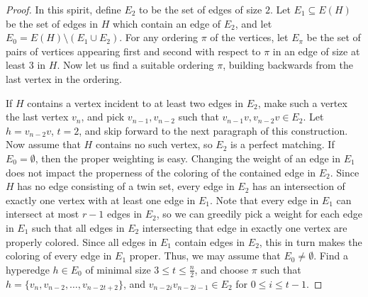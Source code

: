 \documentclass[reqno,12pt,epsf]{amsart}
\begin{document}
\begin{proof}
In this spirit, define $E_2$ to be the set of edges of size $2$.
Let $E_1\subseteq E(H)$ be the set of edges in $H$ which contain an edge of $E_2$, and let $E_0=E(H)\setminus (E_1\cup E_2)$. %
For any ordering $\pi$ of the vertices, let $E_\pi$ be the set of pairs of vertices appearing first and second with respect to $\pi$ in an edge of size at least $3$ in $H$. Now let us find a suitable ordering $\pi$, building backwards from the last vertex in the ordering.

If $H$ contains a vertex incident to at least two edges in $E_2$, make such a vertex the last vertex $v_n$, 
and pick $v_{n-1},v_{n-2}$ such that $v_{n-1}v,v_{n-2}v\in E_2$. Let $h=v_{n-2}v$, $t=2$,
and skip forward to the next paragraph of this construction. 
Now assume that $H$ contains no such vertex, so $E_2$ is a perfect matching. 
If $E_0=\emptyset$, then the proper weighting is easy. Changing the weight of an edge in $E_1$ does not impact the properness of the coloring of the contained edge in $E_2$. Since $H$ has no edge consisting of a twin set, every edge in $E_2$ has an intersection of exactly one vertex with at least one edge in $E_1$.
Note that every edge in $E_1$ can intersect at most $r-1$ edges in $E_2$, so we can greedily pick a weight for each edge in $E_1$ such that all edges in $E_2$ intersecting that edge in exactly one vertex are properly colored.
Since all edges in $E_1$ contain edges in $E_2$, this in turn makes the coloring of every edge in $E_1$ proper.
Thus, we may assume that $E_0\ne \emptyset$. 
Find a hyperedge $h\in E_0$ of minimal size $3\le t\le \frac{n}2$, and choose $\pi$ such that $h=\{v_n,v_{n-2},\ldots,v_{n-2t+2}\}$, and $v_{n-2i}v_{n-2i-1}\in E_2$ for $0\le i\le t-1$.



\end{proof}
\end{document}
